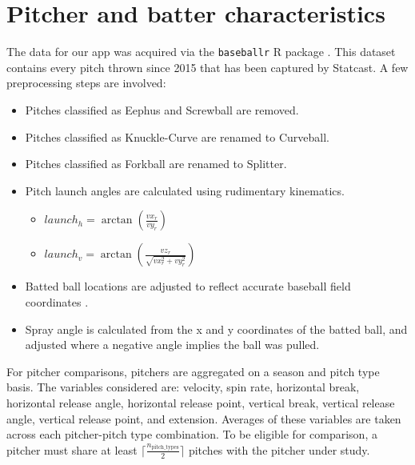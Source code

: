 \documentclass[11pt]{article}
\begin{document}
\section{Pitcher and batter characteristics}

The data for our app was acquired via the \texttt{baseballr} R package \citep{baseballr}. This dataset contains every pitch thrown since 2015 that has been captured by Statcast. A few preprocessing steps are involved:
\begin{itemize}
    \item Pitches classified as Eephus and Screwball are removed.
    \item Pitches classified as Knuckle-Curve are renamed to Curveball.
    \item Pitches classified as Forkball are renamed to Splitter.
    \item Pitch launch angles are calculated using rudimentary kinematics.
        \begin{itemize}
            \item $launch_h = \arctan(\frac{vx_r}{vy_r})$
            \item $launch_v = \arctan\left(\frac{vz_r}{\sqrt{vx_r^2 + vy_r^2}}\right)$
        \end{itemize}
    \item Batted ball locations are adjusted to reflect accurate baseball field coordinates \citep{petti2017research}.
    \item Spray angle is calculated from the x and y coordinates of the batted ball, and adjusted where a negative angle implies the ball was pulled.
\end{itemize}

For pitcher comparisons, pitchers are aggregated on a season and pitch type basis. The variables considered are: velocity, spin rate, horizontal break, horizontal release angle, horizontal release point, vertical break, vertical release angle, vertical release point, and extension. Averages of these variables are taken across each pitcher-pitch type combination.
To be eligible for comparison, a pitcher must share at least  $\lceil \frac{n_{\text{pitch\_types}}}{2} \rceil$ pitches with the pitcher under study.
\end{document}
